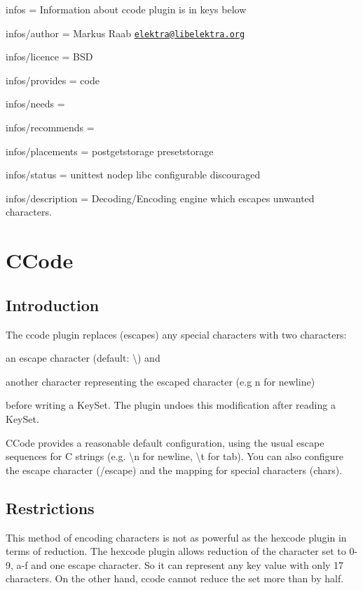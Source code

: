 
\begin{DoxyItemize}
\item infos = Information about ccode plugin is in keys below
\item infos/author = Markus Raab \href{mailto:elektra@libelektra.org}{\tt elektra@libelektra.\+org}
\item infos/licence = B\+SD
\item infos/provides = code
\item infos/needs =
\item infos/recommends =
\item infos/placements = postgetstorage presetstorage
\item infos/status = unittest nodep libc configurable discouraged
\item infos/description = Decoding/\+Encoding engine which escapes unwanted characters.
\end{DoxyItemize}\hypertarget{autotoc_md79_src_plugins_ccode_README_md}{}\section{C\+Code}\label{autotoc_md79_src_plugins_ccode_README_md}
\hypertarget{autotoc_md79_autotoc_md80}{}\subsection{Introduction}\label{autotoc_md79_autotoc_md80}
The {\ttfamily ccode} plugin replaces (escapes) any special characters with two characters\+:


\begin{DoxyItemize}
\item an escape character (default\+: {\ttfamily \textbackslash{}}) and
\item another character representing the escaped character (e.\+g {\ttfamily n} for newline)
\end{DoxyItemize}

before writing a {\ttfamily Key\+Set}. The plugin undoes this modification after reading a {\ttfamily Key\+Set}.

C\+Code provides a reasonable default configuration, using the usual escape sequences for C strings (e.\+g. {\ttfamily \textbackslash{}n} for newline, {\ttfamily \textbackslash{}t} for tab). You can also configure the escape character ({\ttfamily /escape}) and the mapping for special characters ({\ttfamily chars}).\hypertarget{autotoc_md79_autotoc_md81}{}\subsection{Restrictions}\label{autotoc_md79_autotoc_md81}
This method of encoding characters is not as powerful as the hexcode plugin in terms of reduction. The hexcode plugin allows reduction of the character set to \textquotesingle{}0\textquotesingle{}-\/\textquotesingle{}9\textquotesingle{}, \textquotesingle{}a\textquotesingle{}-\/\textquotesingle{}f\textquotesingle{} and one escape character. So it can represent any key value with only 17 characters. On the other hand, ccode cannot reduce the set more than by half.

